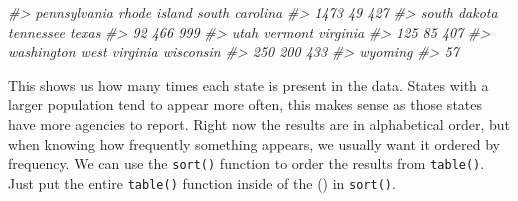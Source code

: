 \documentclass[
]{krantz}
\makeatletter
\newenvironment{Shaded}{\begin{snugshade}}{\end{snugshade}}
\newcommand{\CommentTok}[1]{\textcolor[rgb]{0.37,0.37,0.37}{\textit{#1}}}
\newenvironment{kframe}{%
\medskip{}
\setlength{\fboxsep}{.8em}
 \def\at@end@of@kframe{}%
 \ifinner\ifhmode%
  \def\at@end@of@kframe{\end{minipage}}%
  \begin{minipage}{\columnwidth}%
 \fi\fi%
 \def\FrameCommand##1{\hskip\@totalleftmargin \hskip-\fboxsep
 \colorbox{shadecolor}{##1}\hskip-\fboxsep
     \hskip-\linewidth \hskip-\@totalleftmargin \hskip\columnwidth}%
 \MakeFramed {\advance\hsize-\width
   \@totalleftmargin\z@ \linewidth\hsize
   \@setminipage}}%
 {\par\unskip\endMakeFramed%
 \at@end@of@kframe}
\renewenvironment{Shaded}{\begin{kframe}}{\end{kframe}}
\makeatother
\begin{document}
\begin{Shaded}
\begin{Highlighting}[]
\CommentTok{\#\textgreater{}         pennsylvania         rhode island       south carolina }
\CommentTok{\#\textgreater{}                 1473                   49                  427 }
\CommentTok{\#\textgreater{}         south dakota            tennessee                texas }
\CommentTok{\#\textgreater{}                   92                  466                  999 }
\CommentTok{\#\textgreater{}                 utah              vermont             virginia }
\CommentTok{\#\textgreater{}                  125                   85                  407 }
\CommentTok{\#\textgreater{}           washington        west virginia            wisconsin }
\CommentTok{\#\textgreater{}                  250                  200                  433 }
\CommentTok{\#\textgreater{}              wyoming }
\CommentTok{\#\textgreater{}                   57}
\end{Highlighting}
\end{Shaded}

This shows us how many times each state is present in the data. States with a larger population tend to appear more often, this makes sense as those states have more agencies to report. Right now the results are in alphabetical order, but when knowing how frequently something appears, we usually want it ordered by frequency. We can use the \texttt{sort()} function to order the results from \texttt{table()}. Just put the entire \texttt{table()} function inside of the () in \texttt{sort()}.
\end{document}
